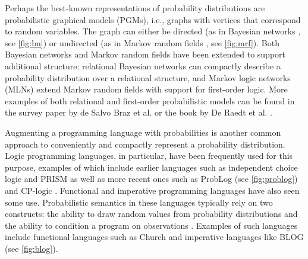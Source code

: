 \documentclass{article}
\begin{document}
Perhaps the best-known representations of probability distributions are
probabilistic graphical models (PGMs), i.e., graphs with vertices that
correspond to random variables. The graph can either be directed (as in Bayesian
networks \cite{DBLP:books/daglib/0066829}, see \cref{fig:bn}) or undirected (as
in Markov random fields \cite{spitzer1971markov}, see \cref{fig:mrf}). Both
Bayesian networks and Markov random fields have been extended to support
additional structure: relational Bayesian networks \cite{DBLP:conf/uai/Jaeger97}
can compactly describe a probability distribution over a relational structure,
and Markov logic networks (MLNs) \cite{DBLP:journals/ml/RichardsonD06} extend
Markov random fields with support for first-order logic. More examples of both
relational and first-order probabilistic models can be found in the survey paper
by de Salvo Braz et al. \cite{DBLP:series/sci/BrazAR08} or the book by De Raedt
et al. \cite{DBLP:series/synthesis/2016Raedt}.

Augmenting a programming language with probabilities is another common approach
to conveniently and compactly represent a probability distribution. Logic
programming languages, in particular, have been frequently used for this
purpose, examples of which include earlier languages such as independent choice
logic \cite{DBLP:journals/ai/Poole97} and PRISM \cite{DBLP:conf/ijcai/SatoK97}
as well as more recent ones such as ProbLog \cite{DBLP:conf/ijcai/RaedtKT07}
(see \cref{fig:problog}) and CP-logic \cite{DBLP:journals/tplp/VennekensDB09}.
Functional and imperative programming languages have also seen some use.
Probabilistic semantics in these languages typically rely on two constructs: the
ability to draw random values from probability distributions and the ability to
condition a program on observations \cite{DBLP:conf/icse/GordonHNR14}. Examples
of such languages include functional languages such as Church
\cite{DBLP:conf/uai/GoodmanMRBT08} and imperative languages like BLOG
\cite{DBLP:conf/ijcai/MilchMRSOK05} (see \cref{fig:blog}).

\end{document}
